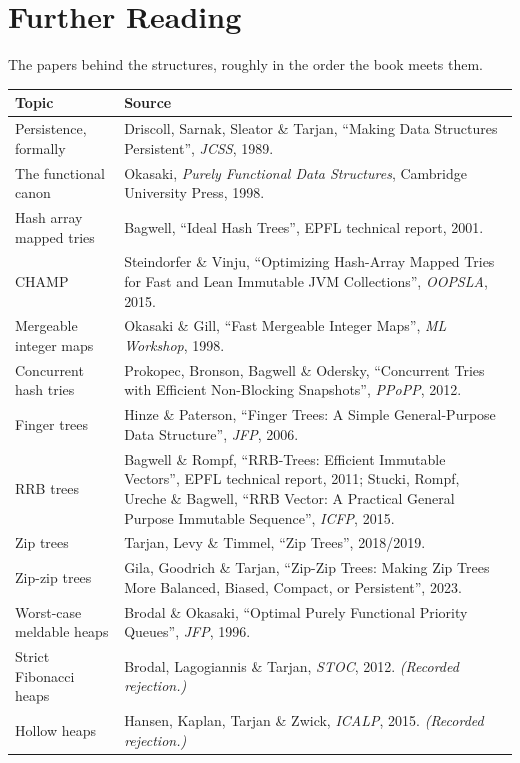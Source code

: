 \documentclass[11pt,twoside,openright]{book}
\makeatletter
\newenvironment{d7table}[1]
  {\par\vspace{3pt}\small
   \setlength{\LTpre}{4pt}\setlength{\LTpost}{4pt}
   \begin{longtable}{@{}%
     >{\raggedright\arraybackslash}p{#1\textwidth}%
     @{\hspace{10pt}}%
     >{\raggedright\arraybackslash}p{\dimexpr\textwidth-#1\textwidth-10pt\relax}@{}}}
  {\end{longtable}}
\newcommand{\thead}[1]{\sffamily\bfseries\footnotesize\color{d7ink}#1}
\makeatother
\begin{document}
\chapter{Further Reading}
\label{app:reading}

\noindent
The papers behind the structures, roughly in the order the book meets them.

\begin{d7table}{0.34}
\toprule
\thead{Topic} & \thead{Source} \\
\midrule
Persistence, formally & Driscoll, Sarnak, Sleator \& Tarjan, ``Making Data
Structures Persistent'', \textit{JCSS}, 1989. \\
The functional canon & Okasaki, \textit{Purely Functional Data Structures},
Cambridge University Press, 1998. \\
Hash array mapped tries & Bagwell, ``Ideal Hash Trees'', EPFL technical report,
2001. \\
CHAMP & Steindorfer \& Vinju, ``Optimizing Hash-Array Mapped Tries for Fast and
Lean Immutable JVM Collections'', \textit{OOPSLA}, 2015. \\
Mergeable integer maps & Okasaki \& Gill, ``Fast Mergeable Integer Maps'',
\textit{ML Workshop}, 1998. \\
Concurrent hash tries & Prokopec, Bronson, Bagwell \& Odersky, ``Concurrent
Tries with Efficient Non-Blocking Snapshots'', \textit{PPoPP}, 2012. \\
Finger trees & Hinze \& Paterson, ``Finger Trees: A Simple General-Purpose Data
Structure'', \textit{JFP}, 2006. \\
RRB trees & Bagwell \& Rompf, ``RRB-Trees: Efficient Immutable Vectors'', EPFL
technical report, 2011; Stucki, Rompf, Ureche \& Bagwell, ``RRB Vector: A
Practical General Purpose Immutable Sequence'', \textit{ICFP}, 2015. \\
Zip trees & Tarjan, Levy \& Timmel, ``Zip Trees'', 2018/2019. \\
Zip-zip trees & Gila, Goodrich \& Tarjan, ``Zip-Zip Trees: Making Zip Trees More
Balanced, Biased, Compact, or Persistent'', 2023. \\
Worst-case meldable heaps & Brodal \& Okasaki, ``Optimal Purely Functional
Priority Queues'', \textit{JFP}, 1996. \\
Strict Fibonacci heaps & Brodal, Lagogiannis \& Tarjan, \textit{STOC}, 2012.
\emph{(Recorded rejection.)} \\
Hollow heaps & Hansen, Kaplan, Tarjan \& Zwick, \textit{ICALP}, 2015.
\emph{(Recorded rejection.)} \\

\end{d7table}
\end{document}
